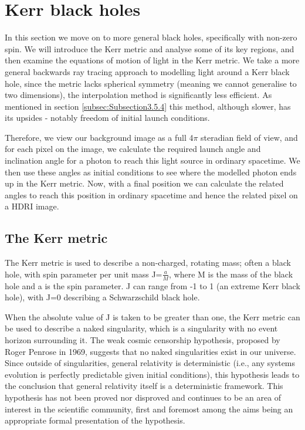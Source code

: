 \documentclass[oneside,openright,frontopenright, singlespacing]{dmathesis}
\begin{document}
\chapter{Kerr black holes}\label{chap:Chapter4}

	In this section we move on to more general black holes, specifically with non-zero spin. We will introduce the Kerr metric and analyse some of its key regions, and then examine the equations of motion of light in the Kerr metric. We take a more general backwards ray tracing approach to modelling light around a Kerr black hole, since the metric lacks spherical symmetry (meaning we cannot generalise to two dimensions), the interpolation method is significantly less efficient. As mentioned in section \ref{subsec:Subsection3.5.4} this method, although slower, has its upsides - notably freedom of initial launch conditions.
	
\vspace{1em}
	Therefore, we view our background image as a full 4$\pi$ steradian field of view, and for each pixel on the image, we calculate the required launch angle and inclination angle for a photon to reach this light source in ordinary spacetime. We then use these angles as initial conditions to see where the modelled photon ends up in the Kerr metric. Now, with a final position we can calculate the related angles to reach this position in ordinary spacetime and hence the related pixel on a HDRI image.

\section{The Kerr metric}\label{sec:Section4.1}

	The Kerr metric is used to describe a non-charged, rotating mass; often a black hole, with spin parameter per unit mass J=$\frac{a}{M}$, where M is the mass of the black hole and a is the spin parameter. J can range from -1 to 1 (an extreme Kerr black hole), with J=0 describing a Schwarzschild black hole.

\vspace{1em}
	When the absolute value of J is taken to be greater than one, the Kerr metric can be used to describe a naked singularity, which is a singularity with no event horizon surrounding it. The weak cosmic censorship hypothesis, proposed by Roger Penrose in 1969\cite{penrose1969gravitational}, suggests that no naked singularities exist in our universe. Since outside of singularities, general relativity is deterministic (i.e., any systems evolution is perfectly predictable given initial conditions), this hypothesis leads to the conclusion that general relativity itself is a deterministic framework. This hypothesis has not been proved nor disproved and continues to be an area of interest in the scientific community, first and foremost among the aims being an appropriate formal presentation of the hypothesis.
\end{document}
